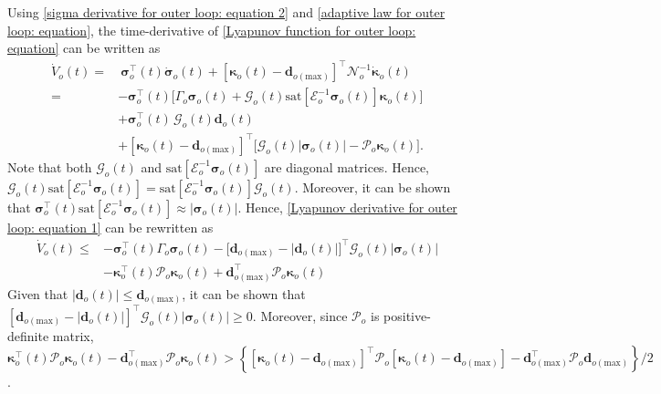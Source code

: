 \documentclass[lettersize,journal]{IEEEtran}
\begin{document}
\noindent Using \eqref{sigma derivative for outer loop: equation 2} and \eqref{adaptive law for outer loop: equation}, the time-derivative of \eqref{Lyapunov function for outer loop: equation} can be written as
\begin{align}
\label{Lyapunov derivative for outer loop: equation 1}
   \dot{V}_o(t)=&~\boldsymbol{\sigma}_o^{\top}(t) \dot{\boldsymbol{\sigma}}_o(t) + \left[\boldsymbol{\kappa}_o(t) - \boldsymbol{d}_{o(\text{max})}\right]^{\top} \mathcal{N}_o^{-1} \dot{\boldsymbol{\kappa}}_o(t)\nonumber\\
   =&- \boldsymbol{\sigma}_o^{\top}(t) \Big[\Gamma_o \boldsymbol{\sigma}_o(t) + \mathcal{G}_o(t) \text{sat}[ \mathcal{E}_o^{-1}\boldsymbol{\sigma}_o(t)] \boldsymbol{\kappa}_o(t)\Big] \nonumber \\ 
   &+ \boldsymbol{\sigma}_o^{\top}(t) \, \mathcal{G}_o(t) \boldsymbol{d}_o(t) \nonumber\\
   ~ & +\left[\boldsymbol{\kappa}_o(t) - \boldsymbol{d}_{o(\text{max})}\right]^{\top} \Big[\mathcal{G}_o(t) \lvert \boldsymbol{\sigma}_o(t) \rvert - \mathcal{P}_{o} \boldsymbol{\kappa}_o(t)\Big].
\end{align} 
Note that both $\mathcal{G}_o(t)$ and $\text{sat}[ \mathcal{E}_o^{-1}\boldsymbol{\sigma}_o(t)]$ are diagonal matrices. Hence, $\mathcal{G}_o(t) \text{sat}[ \mathcal{E}_o^{-1}\boldsymbol{\sigma}_o(t)] = \text{sat}[ \mathcal{E}_o^{-1}\boldsymbol{\sigma}_o(t)] \mathcal{G}_o(t)$.
Moreover, it can be shown that $\boldsymbol{\sigma}_o^{\top}(t) \text{sat}[ \mathcal{E}_o^{-1}\boldsymbol{\sigma}_o(t)] \approx \lvert \boldsymbol{\sigma}_o(t) \rvert$.
Hence, \eqref{Lyapunov derivative for outer loop: equation 1} can be rewritten as 
\begin{align}
\label{Lyapunov derivative for outer loop: equation 2}
   \dot{V}_o(t) \leq&- \boldsymbol{\sigma}_o^{\top}(t) \Gamma_o \boldsymbol{\sigma}_o(t) - \big[ \boldsymbol{d}_{o(\text{max})} - \lvert \boldsymbol{d}_o(t) \rvert\big]^{\top} \mathcal{G}_o(t) \lvert \boldsymbol{\sigma}_o(t) \rvert \nonumber\\
   ~ & - \boldsymbol{\kappa}_o^{\top}(t) \mathcal{P}_{o} \boldsymbol{\kappa}_o(t) + \boldsymbol{d}_{o(\text{max})}^{\top} \mathcal{P}_{o} \boldsymbol{\kappa}_o(t)
\end{align}
Given that $\lvert \boldsymbol{d}_o(t) \rvert \leq \boldsymbol{d}_{o(\text{max})}$, it can be shown that $\left[\boldsymbol{d}_{o(\text{max})} -\lvert \boldsymbol{d}_o(t) \rvert\right]^{\top} \mathcal{G}_o(t) \lvert \boldsymbol{\sigma}_o(t) \rvert \geq 0$.
Moreover, since $\mathcal{P}_{o}$ is positive-definite matrix, $\boldsymbol{\kappa}_o^{\top}(t) \mathcal{P}_{o} \boldsymbol{\kappa}_o(t) - \boldsymbol{d}_{o(\text{max})}^{\top} \mathcal{P}_{o} \boldsymbol{\kappa}_o(t) > \left\{\left[\boldsymbol{\kappa}_o(t) - \boldsymbol{d}_{o(\text{max})}\right]^{\top} \mathcal{P}_{o} \left[\boldsymbol{\kappa}_o(t) - \boldsymbol{d}_{o(\text{max})}\right] - \boldsymbol{d}_{o(\text{max})}^{\top} \mathcal{P}_{o} \boldsymbol{d}_{o(\text{max})} \right\}/2$.
\end{document}
